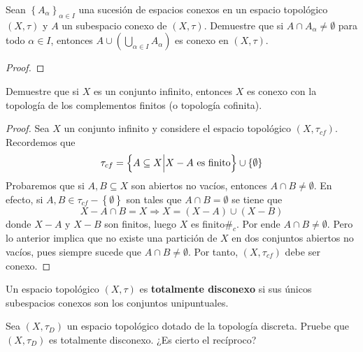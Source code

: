\documentclass[12pt]{report}
\theoremstyle{largebreak}
\newcommand\contradiction{\ensuremath{\#_c}}
\begin{document}
    \begin{excer}
        Sean $\left\{A_\alpha \right\}_{\alpha\in I}$ una sucesión de espacios conexos en un espacio topológico $(X,\tau)$ y $A$ un subespacio conexo de $(X,\tau)$. Demuestre que si $A\cap A_\alpha\neq\emptyset$ para todo $\alpha\in I$, entonces $A\cup\left(\bigcup_{\alpha\in I}A_\alpha \right)$ es conexo en $(X,\tau)$. 
    \end{excer}

    \begin{proof}
        
    \end{proof}

    \begin{excer}
        Demuestre que si $X$ es un conjunto infinito, entonces $X$ es conexo con la topología de los complementos finitos (o topología cofinita).
    \end{excer}

    \begin{proof}
        Sea $X$ un conjunto infinito y considere el espacio topológico $(X,\tau_{cf})$. Recordemos que
        \begin{equation*}
            \tau_{cf}=\left\{A\subseteq X\Big|X-A\textup{ es finito} \right\}\cup\left\{\emptyset \right\}
        \end{equation*}
        Probaremos que si $A,B\subseteq X$ son abiertos no vacíos, entonces $A\cap B\neq\emptyset$. En efecto, si $A,B\in\tau_{cf}-\left\{\emptyset \right\}$ son tales que $A\cap B=\emptyset$ se tiene que
        \begin{equation*}
            X-A\cap B=X\Rightarrow X=(X-A)\cup(X-B)
        \end{equation*}
        donde $X-A$ y $X-B$ son finitos, luego $X$ es finito\contradiction. Por ende $A\cap B\neq\emptyset$. Pero lo anterior implica que no existe una partición de $X$ en dos conjuntos abiertos no vacíos, pues siempre sucede que $A\cap B\neq\emptyset$. Por tanto, $(X,\tau_{cf})$ debe ser conexo.
    \end{proof}

    \begin{mydef}
        Un espacio topológico $(X,\tau)$ es \textbf{totalmente disconexo} si sus únicos subespacios conexos son los conjuntos unipuntuales.
    \end{mydef}

    \begin{excer}
        Sea $(X,\tau_D)$ un espacio topológico dotado de la topología discreta. Pruebe que $(X,\tau_D)$ es totalmente disconexo. ¿Es cierto el recíproco?
    \end{excer}
\end{document}
